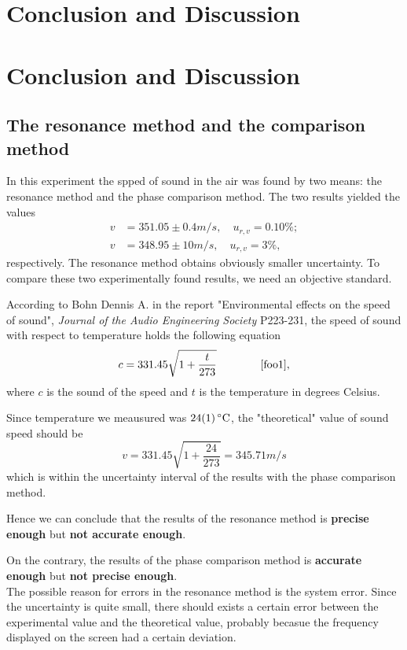 \section{Conclusion and Discussion}

\section{Conclusion and Discussion}
\subsection{The resonance method and the comparison method}
    In this experiment the spped of sound in the air was found by two means: the resonance method and the phase comparison method. The two results yielded the values
    \begin{equation}\label{res}
    \begin{split}
        v&=351.05\pm0.4 m/s,\quad u_{r,v}=0.10\%;\\
        v&=348.95\pm10 m/s,\quad u_{r,v}=3\%,
    \end{split}
    \end{equation}
    respectively. The resonance method obtains obviously smaller uncertainty. To compare these two experimentally found results, we need an objective standard.

    According to Bohn Dennis A. in the report "Environmental effects on the speed of sound", \emph{Journal of the Audio Engineering Society} P223-231, the speed of sound with respect to temperature holds the following equation
    \[
        c=331.45\sqrt{1+\frac{t}{273}}\quad\quad\quad\quad\cite{foo1},
    \]
    where $c$ is the sound of the speed and $t$ is the temperature in degrees Celsius.

    Since temperature we meausured was $\SI{24\pm1}{\degreeCelsius}$, the "theoretical" value of sound speed should be
    \[
        v=331.45\sqrt{1+\frac{24}{273}}=345.71m/s
    \]
    which is within the uncertainty interval of the results with the phase comparison method.

    Hence we can conclude that the results of the resonance method is \textbf{precise enough} but \textbf{not accurate enough}. 
    
    On the contrary, the results of the phase comparison method is \textbf{accurate enough} but \textbf{not precise enough}.\\

    The possible reason for errors in the resonance method is the system error. Since the uncertainty is quite small, there should exists a certain error between the experimental value and the theoretical value, probably becasue the frequency displayed on the screen had a certain deviation.

